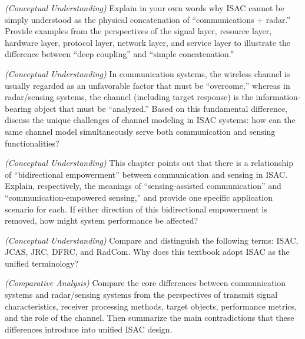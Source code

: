 \begin{enumerate}[label=\textbf{\arabic*.}, leftmargin=*]

    \item \textit{(Conceptual Understanding)} Explain in your own words why ISAC cannot be simply understood as the physical concatenation of ``communications + radar.'' Provide examples from the perspectives of the signal layer, resource layer, hardware layer, protocol layer, network layer, and service layer to illustrate the difference between ``deep coupling'' and ``simple concatenation.''

    \item \textit{(Conceptual Understanding)} In communication systems, the wireless channel is usually regarded as an unfavorable factor that must be ``overcome,'' whereas in radar/sensing systems, the channel (including target response) is the information-bearing object that must be ``analyzed.'' Based on this fundamental difference, discuss the unique challenges of channel modeling in ISAC systems: how can the same channel model simultaneously serve both communication and sensing functionalities?

    \item \textit{(Conceptual Understanding)} This chapter points out that there is a relationship of ``bidirectional empowerment'' between communication and sensing in ISAC. Explain, respectively, the meanings of ``sensing-assisted communication'' and ``communication-empowered sensing,'' and provide one specific application scenario for each. If either direction of this bidirectional empowerment is removed, how might system performance be affected?
    
    \begin{sloppypar}
    \item \textit{(Conceptual Understanding)} Compare and distinguish the following terms: ISAC, JCAS, JRC, DFRC, and RadCom. Why does this textbook adopt ISAC as the unified terminology?
    \end{sloppypar}

    \item \textit{(Comparative Analysis)} Compare the core differences between communication systems and radar/sensing systems from the perspectives of transmit signal characteristics, receiver processing methods, target objects, performance metrics, and the role of the channel. Then summarize the main contradictions that these differences introduce into unified ISAC design.
    

\end{enumerate}
